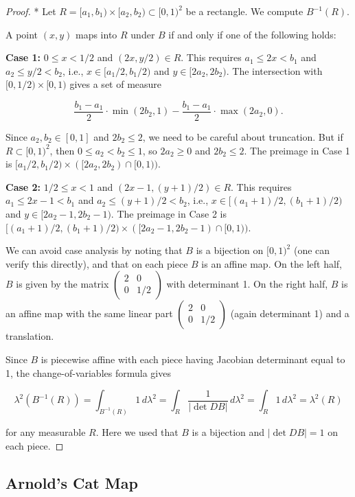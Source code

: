 \begin{proof}
* Let $R = [a_1, b_1) \times [a_2, b_2) \subset [0,1)^2$ be a rectangle. We compute $B^{-1}(R)$.

A point $(x,y)$ maps into $R$ under $B$ if and only if one of the following holds:

\textbf{Case 1:} $0 \le x < 1/2$ and $(2x, y/2) \in R$. This requires $a_1 \le 2x < b_1$ and $a_2 \le y/2 < b_2$, i.e., $x \in [a_1/2, b_1/2)$ and $y \in [2a_2, 2b_2)$. The intersection with $[0,1/2) \times [0,1)$ gives a set of measure

\[
\frac{b_1 - a_1}{2} \cdot \min(2b_2, 1) - \frac{b_1 - a_1}{2} \cdot \max(2a_2, 0).
\]

Since $a_2, b_2 \in [0,1]$ and $2b_2 \le 2$, we need to be careful about truncation. But if $R \subset [0,1)^2$, then $0 \le a_2 < b_2 \le 1$, so $2a_2 \ge 0$ and $2b_2 \le 2$. The preimage in Case 1 is $[a_1/2, b_1/2) \times ([2a_2, 2b_2) \cap [0,1))$.

\textbf{Case 2:} $1/2 \le x < 1$ and $(2x - 1, (y+1)/2) \in R$. This requires $a_1 \le 2x - 1 < b_1$ and $a_2 \le (y+1)/2 < b_2$, i.e., $x \in [(a_1+1)/2, (b_1+1)/2)$ and $y \in [2a_2 - 1, 2b_2 - 1)$. The preimage in Case 2 is $[(a_1+1)/2, (b_1+1)/2) \times ([2a_2 - 1, 2b_2 - 1) \cap [0,1))$.

We can avoid case analysis by noting that $B$ is a bijection on $[0,1)^2$ (one can verify this directly), and that on each piece $B$ is an affine map. On the left half, $B$ is given by the matrix $\begin{pmatrix} 2 & 0 \\ 0 & 1/2 \end{pmatrix}$ with determinant 1. On the right half, $B$ is an affine map with the same linear part $\begin{pmatrix} 2 & 0 \\ 0 & 1/2 \end{pmatrix}$ (again determinant 1) and a translation.

Since $B$ is piecewise affine with each piece having Jacobian determinant equal to 1, the change-of-variables formula gives

\[
\lambda^2(B^{-1}(R)) = \int_{B^{-1}(R)} 1 \, d\lambda^2 = \int_R \frac{1}{|\det DB|} \, d\lambda^2 = \int_R 1 \, d\lambda^2 = \lambda^2(R)
\]

for any measurable $R$. Here we used that $B$ is a bijection and $|\det DB| = 1$ on each piece.
\end{proof}


\subsection{Arnold's Cat Map}\label{sec:8.2.4}

